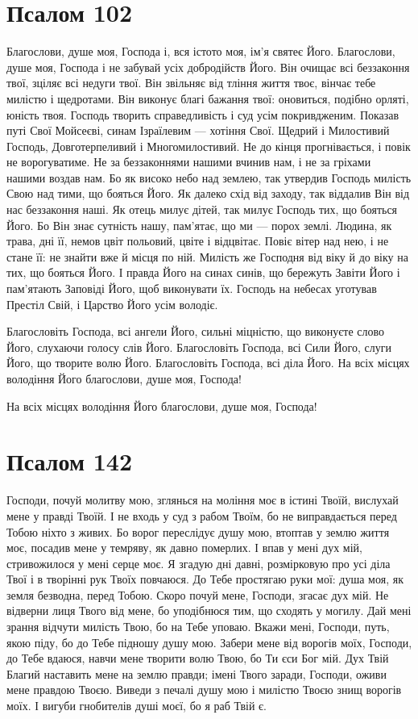 \documentclass[chapters.tex]{subfiles}
\begin{document}
\section{Псалом 102}
Благослови, душе моя, Господа і, вся істото моя, ім’я святеє Його. Благослови, душе моя, Господа і не забувай усіх добродійств Його. Він очищає всі беззаконня твої, зціляє всі недуги твої. Він звільняє від тління життя твоє, вінчає тебе милістю і щедротами. Він виконує благі бажання твої: оновиться, подібно орляті, юність твоя. Господь творить справедливість і суд усім покривдженим. Показав путі Свої Мойсеєві, синам Ізраїлевим — хотіння Свої. Щедрий і Милостивий Господь, Довготерпеливий і Многомилостивий. Не до кінця прогнівається, і повік не ворогуватиме. Не за беззаконнями нашими вчинив нам, і не за гріхами нашими воздав нам. Бо як високо небо над землею, так утвердив Господь милість Свою над тими, що бояться Його. Як далеко схід від заходу, так віддалив Він від нас беззаконня наші. Як отець милує дітей, так милує Господь тих, що бояться Його. Бо Він знає сутність нашу, пам’ятає, що ми — порох землі. Людина, як трава, дні її, немов цвіт польовий, цвіте і відцвітає. Повіє вітер над нею, і не стане її: не знайти вже й місця по ній. Милість же Господня від віку й до віку на тих, що бояться Його. І правда Його на синах синів, що бережуть Завіти Його і пам’ятають Заповіді Його, щоб виконувати їх. Господь на небесах уготував Престіл Свій, і Царство Його усім володіє.

Благословіть Господа, всі ангели Його, сильні міцністю, що виконуєте слово Його, слухаючи голосу слів Його. Благословіть Господа, всі Сили Його, слуги Його, що творите волю Його. Благословіть Господа, всі діла Його. На всіх місцях володіння Його благослови, душе моя, Господа!

На всіх місцях володіння Його благослови, душе моя, Господа!

\section{Псалом 142}
Господи, почуй молитву мою, зглянься на моління моє в істині Твоїй, вислухай мене у правді Твоїй. І не входь у суд з рабом Твоїм, бо не виправдається перед Тобою ніхто з живих. Бо ворог переслідує душу мою, втоптав у землю життя моє, посадив мене у темряву, як давно померлих. І впав у мені дух мій, стривожилося у мені серце моє. Я згадую дні давні, розмірковую про усі діла Твої і в творінні рук Твоїх повчаюся. До Тебе простягаю руки мої: душа моя, як земля безводна, перед Тобою. Скоро почуй мене, Господи, згасає дух мій. Не відверни лиця Твого від мене, бо уподібнюся тим, що сходять у могилу. Дай мені зрання відчути милість Твою, бо на Тебе уповаю. Вкажи мені, Господи, путь, якою піду, бо до Тебе підношу душу мою. Забери мене від ворогів моїх, Господи, до Тебе вдаюся, навчи мене творити волю Твою, бо Ти єси Бог мій. Дух Твій Благий наставить мене на землю правди; імені Твого заради, Господи, оживи мене правдою Твоєю. Виведи з печалі душу мою і милістю Твоєю знищ ворогів моїх. І вигуби гнобителів душі моєї, бо я раб Твій є.
\end{document}

